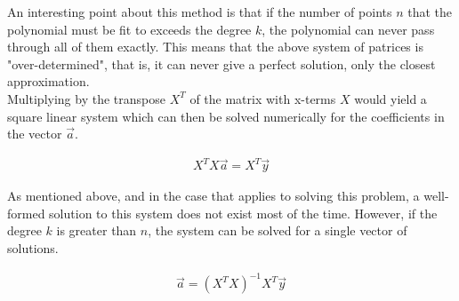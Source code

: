 \documentclass[12pt, a4paper, twoside]{article}
\begin{document}
An interesting point about this method is that if the number of points $n$ that
the polynomial must be fit to exceeds the degree $k$, the polynomial can never pass
through all of them exactly. This means that the above system of patrices is
"over-determined", that is, it can never give a perfect solution, only the
closest approximation. \\

Multiplying by the transpose $X^T$ of the matrix with x-terms $X$ would yield
a square linear system which can then be solved numerically for the coefficients in the
vector $\vec{a}$.

\begin{align*}
    X^TX\vec{a}=X^T\vec{y}
\end{align*}

As mentioned above, and in the case that applies to solving this problem, a well-formed
solution to this system does not exist most of the time. However, if the degree $k$
is greater than $n$, the system can be solved for a
single vector of solutions.

\begin{align*}
    \vec{a}=(X^TX)^{-1}X^T\vec{y}
\end{align*}
\end{document}
